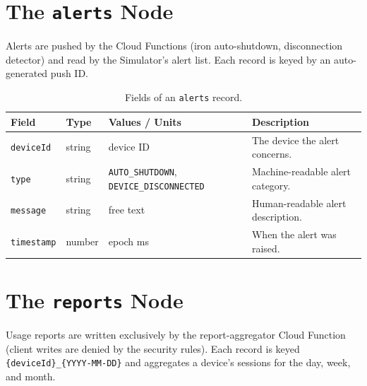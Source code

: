 \documentclass[11pt,a4paper]{article}
\begin{document}
\section{The \texttt{alerts} Node}
\label{sec:alerts}

Alerts are pushed by the Cloud Functions (iron auto-shutdown, disconnection detector) and read by the
Simulator's alert list. Each record is keyed by an auto-generated push ID.

\begin{table}[H]
\centering
\caption{Fields of an \texttt{alerts} record.}
\label{tab:alerts}
\begin{tabularx}{\textwidth}{@{}l l X X@{}}
\toprule
\textbf{Field} & \textbf{Type} & \textbf{Values / Units} & \textbf{Description} \\
\midrule
\texttt{deviceId} & string & device ID & The device the alert concerns. \\
\texttt{type} & string & \texttt{AUTO\_SHUTDOWN}, \texttt{DEVICE\_DISCONNECTED} & Machine-readable alert category. \\
\texttt{message} & string & free text & Human-readable alert description. \\
\texttt{timestamp} & number & epoch ms & When the alert was raised. \\
\bottomrule
\end{tabularx}
\end{table}

\section{The \texttt{reports} Node}
\label{sec:reports}

Usage reports are written exclusively by the report-aggregator Cloud Function (client writes are
denied by the security rules). Each record is keyed \texttt{\{deviceId\}\_\{YYYY-MM-DD\}} and
aggregates a device's sessions for the day, week, and month.
\end{document}
